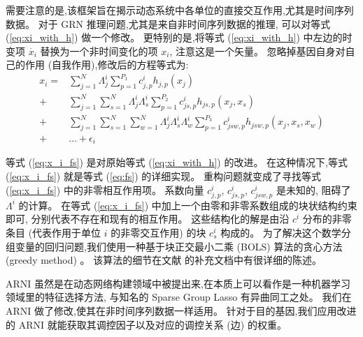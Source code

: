 需要注意的是,该框架旨在揭示动态系统中各单位的直接交互作用,尤其是时间序列数据。
对于 GRN 推理问题,尤其是来自非时间序列数据的推理,
可以对等式 (\ref{eq:xi_with_h}) 做一个修改。
更特别的是,将等式 (\ref{eq:xi_with_h}) 中左边的时变项 $\dot{x_i}$ 替换为一个非时间变化的项 $x_i$, 注意这是一个矢量。
忽略掉基因自身对自己的作用 (自我作用),修改后的方程等式为:
\begin{equation}
\label{eq:x_i_fs}
\begin{split}
   x_i = &\sum_{j=1}^{N} \Lambda^i_{j} \sum_{p=1}^{P_1} c^i_{j,p}h_{j,p}(x_j)\\ 
       + &\sum_{j=1}^{N} \sum_{s=1}^{N}\Lambda^i_{j}\Lambda^i_{s} \sum_{p=1}^{P_2} c^i_{js,p}h_{js,p}(x_j,x_s) \\ 
       + &\sum_{j=1}^{N} \sum_{s=1}^{N} \sum_{w=1}^{N}\Lambda^i_{j}\Lambda^i_{s}\Lambda^i_{w} \sum_{p=1}^{P_3} c^i_{jsw,p}h_{jsw,p}(x_j,x_s,x_w)\\
       +&\ldots + \epsilon_{i}
   \end{split}
\end{equation}

等式 (\ref{eq:x_i_fs}) 是对原始等式 (\ref{eq:xi_with_h}) 的改进。
在这种情况下,等式 (\ref{eq:x_i_fs}) 就是等式 (\ref{eq:fs}) 的详细实现。
重构问题就变成了寻找等式 (\ref{eq:x_i_fs}) 中的非零相互作用项。
系数向量 $c^i_{j,p}$, $c^i_{js,p}$, $c^i_{jsw,p}$ 是未知的,
阻碍了 $\Lambda^i$ 的计算。
在等式 (\ref{eq:x_i_fs}) 中加上一个由零和非零系数组成的块状结构约束即可,
分别代表不存在和现有的相互作用。
这些结构化的解是由沿 $c^i$ 分布的非零条目 (代表作用于单位 $i$ 的非零交互作用) 的块 $c^i_s$ 构成的。
为了解决这个数学分组变量的回归问题,我们使用一种基于块正交最小二乘 (BOLS) 算法的贪心方法 (greedy method) \cite{majumdar2009fast}。
该算法的细节在文献 \cite{casadiego2017model} 的补充文档中有很详细的陈述。

ARNI 虽然是在动态网络构建领域中被提出来,在本质上可以看作是一种机器学习领域里的特征选择方法,
与知名的 Sparse Group Lasso \cite{friedman2010note} 有异曲同工之处。
我们在 ARNI 做了修改,使其在非时间序列数据一样适用。
针对于目的基因,我们应用改进的 ARNI 就能获取其调控因子以及对应的调控关系 (边) 的权重。

